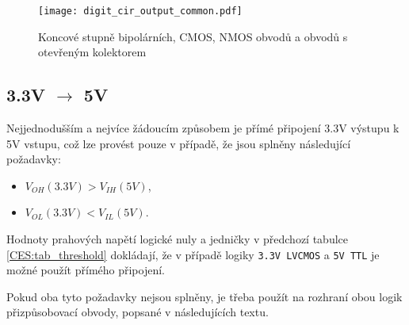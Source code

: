{    \begin{figure}[ht!]
         \centering
         \texttt{[image: digit\_cir\_output\_common.pdf]}
         \caption[Koncové stupně digitálních obvodů]
                 {Koncové stupně bipolárních, CMOS, NMOS obvodů a obvodů s otevřeným kolektorem 
                  \cite[p.~2]{AN240}}
         \label{ces:fig_digit_out_common}
    \end{figure}   
    
    \subsection{3.3V $\rightarrow$ 5V} %
      Nejjednodušším a nejvíce žádoucím způsobem je přímé připojení 3.3V výstupu k 5V vstupu, což
      lze provést pouze v případě, že jsou splněny následující požadavky:
        \begin{itemize}\addtolength{\itemsep}{-0.5\baselineskip}
          \item $V_{OH}(3.3V)>V_{IH}(5V)$,
          \item $V_{OL}(3.3V)<V_{IL}(5V)$.
        \end{itemize}
      Hodnoty prahových napětí logické nuly a jedničky v předchozí tabulce \ref{CES:tab_threshold}
      dokládají, že v případě logiky \texttt{3.3V LVCMOS} a \texttt{5V TTL} je možné použít přímého
      připojení. 


      Pokud oba tyto požadavky nejsou splněny, je třeba použít na rozhraní obou logik
      přizpůsobovací obvody, popsané v následujících textu. 

}
